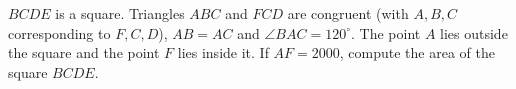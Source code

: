 $BCDE$ is a square. Triangles $ABC$ and $FCD$ are congruent (with $A,B,C$ corresponding to $F,C,D$), $AB=AC$ and $\angle BAC=120^\circ$. The point $A$ lies outside the square and the point $F$ lies inside it. If $AF=2000$, compute the area of the square $BCDE$.
